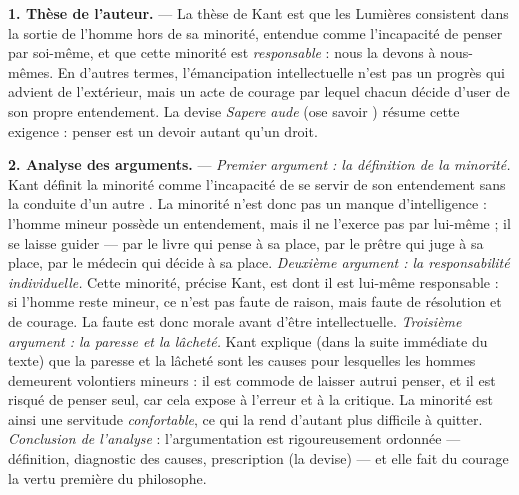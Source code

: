 \documentclass[11pt]{article}
\begin{document}
\begin{corrige}
\textbf{1. Thèse de l'auteur.} --- La thèse de Kant est que les Lumières consistent dans la sortie de l'homme hors de sa minorité, entendue comme l'incapacité de penser par soi-même, et que cette minorité est \emph{responsable} : nous la devons à nous-mêmes. En d'autres termes, l'émancipation intellectuelle n'est pas un progrès qui advient de l'extérieur, mais un acte de courage par lequel chacun décide d'user de son propre entendement. La devise \emph{Sapere aude} (\guillemotleft ose savoir \guillemotright) résume cette exigence : penser est un devoir autant qu'un droit.

\textbf{2. Analyse des arguments.} --- \emph{Premier argument : la définition de la minorité.} Kant définit la minorité comme \guillemotleft l'incapacité de se servir de son entendement sans la conduite d'un autre \guillemotright. La minorité n'est donc pas un manque d'intelligence : l'homme mineur possède un entendement, mais il ne l'exerce pas par lui-même ; il se laisse guider --- par le livre qui pense à sa place, par le prêtre qui juge à sa place, par le médecin qui décide à sa place. \emph{Deuxième argument : la responsabilité individuelle.} Cette minorité, précise Kant, est \guillemotleft dont il est lui-même responsable \guillemotright : si l'homme reste mineur, ce n'est pas faute de raison, mais faute de résolution et de courage. La faute est donc morale avant d'être intellectuelle. \emph{Troisième argument : la paresse et la lâcheté.} Kant explique (dans la suite immédiate du texte) que la paresse et la lâcheté sont les causes pour lesquelles les hommes demeurent volontiers mineurs : il est commode de laisser autrui penser, et il est risqué de penser seul, car cela expose à l'erreur et à la critique. La minorité est ainsi une servitude \emph{confortable}, ce qui la rend d'autant plus difficile à quitter. \emph{Conclusion de l'analyse} : l'argumentation est rigoureusement ordonnée --- définition, diagnostic des causes, prescription (la devise) --- et elle fait du courage la vertu première du philosophe.


\end{corrige}
\end{document}
